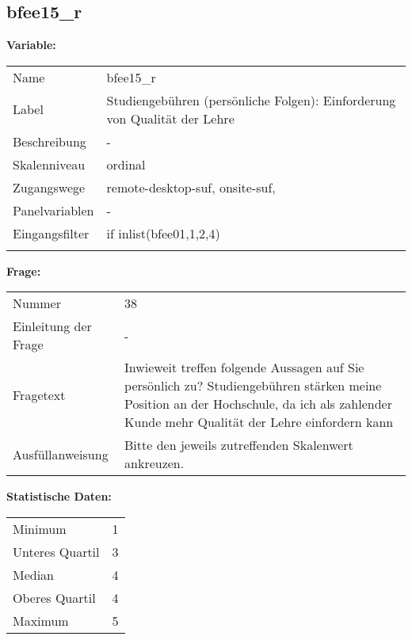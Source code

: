 	
	
	\subsection{bfee15\_r}
	\label{subSection:bfee15_r}

	\noindent\textbf{Variable:}\\
		\begin{tabular}{lL{11.3cm}}
			\label{tableVariable:bfee15_r}
			Name & bfee15\_r \\
			Label & Studiengebühren (persönliche Folgen): Einforderung von Qualität der Lehre \\
			Beschreibung & - \\
			Skalenniveau & ordinal \\
			Zugangswege &
				remote-desktop-suf,
				onsite-suf,
 \\
			Panelvariablen & -
			 \\
			Eingangsfilter & if inlist(bfee01,1,2,4) \\
 \\
		\end{tabular}

		\vspace*{1 cm}
		\noindent\textbf{Frage:}\\
		\begin{tabular}{lL{11.3cm}}
			\label{tableQuestion:bfee15_r}
			Nummer & 38 \\
			Einleitung der Frage & - \\
			Fragetext & Inwieweit treffen folgende Aussagen auf Sie persönlich zu?
Studiengebühren stärken meine Position an der Hochschule, da ich als zahlender Kunde mehr Qualität der Lehre einfordern kann \\
			Ausfüllanweisung & Bitte den jeweils zutreffenden Skalenwert ankreuzen. \\
		\end{tabular}


		\vspace*{1 cm}
		\noindent\textbf{Statistische Daten:}\\
			\begin{tabular}{ll}
				\label{tableStatistics:bfee15_r}
					Minimum & 1 \\
					Unteres Quartil & 3 \\
					Median & 4 \\
					Oberes Quartil & 4 \\
					Maximum & 5 \\
			\end{tabular}



